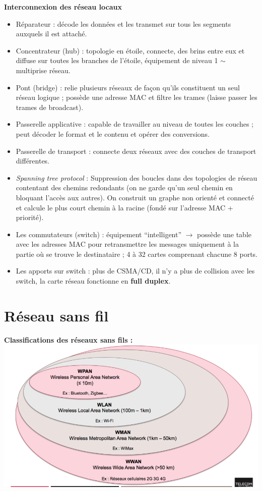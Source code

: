 \documentclass[a4paper,9pt, twocolumn]{article}
\newcommand\rar{\rightarrow}
\begin{document}
	\textbf{Interconnexion des réseau locaux}
	\begin{itemize}
		\item Réparateur : décode les données et les transmet sur tous les segments auxquels il est attaché.
		\item Concentrateur (hub) : topologie en étoile, connecte, des brins entre eux et diffuse sur toutes les branches de l'étoile, équipement de niveau 1 $\sim$ multiprise réseau.
		\item Pont (bridge) : relie plusieurs réseaux de façon qu'ils constituent un seul réseau logique ; possède une adresse MAC et filtre les trames (laisse passer les trames de broadcast).
		\item Passerelle applicative : capable de travailler au niveau de toutes les couches ; peut décoder le format et le contenu et opérer des conversions.
		\item Passerelle de transport : connecte deux réseaux avec des couches de transport différentes.
		\item \emph{Spanning tree protocol} : Suppression des boucles dans des topologies de réseau contentant des chemins redondants (on ne garde qu'un seul chemin en bloquant l'accès aux autres).
			On construit un graphe non orienté et connecté et calcule le plus court chemin à la racine (fondé sur l'adresse MAC + priorité).
		\item Les commutateurs (switch) : équipement “intelligent” $\rar$ possède une table avec les adresses MAC pour retransmettre les messages uniquement à la partie où se trouve le destinataire ; 4 à 32 cartes comprenant chacune 8 ports.
		\item Les apports sur switch : plus de CSMA/CD, il n'y a plus de collision avec les switch, la carte réseau fonctionne en \textbf{full duplex}.
	\end{itemize}


\section*{Réseau sans fil}

	\textbf{Classifications des réseaux sans fils :} 
	\includegraphics[scale=0.55]{res.png}
	
\end{document}
